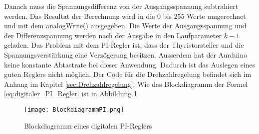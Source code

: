 Danach muss die Spannungsdifferenz von der Ausgangsspannung subtrahiert werden. Das Resultat der Berechnung wird in die 0 bis 255 Werte umgerechnet und mit dem analogWrite() ausgegeben. Die Werte der Ausgangsspannung und der Differenzspannung werden nach der Ausgabe in den Laufparameter $k-1$ geladen. Das Problem mit dem PI-Regler ist, dass der Thyristorsteller und die Spannungsverstärkung eine Verzögerung besitzen. Ausserdem hat der Aurduino keine konstante Abtastrate bei dieser Anwendung. Dadurch ist das Auslegen eines guten Reglers nicht möglich. Der Code für die Drehzahlregelung befindet sich im Anhang im Kapitel \ref{sec:Drehzahlregelung}. Wie das Blockdiagramm der Formel \ref{eq:digitaler_PI_Regler} ist in Abbildung \ref{fig:PIRegler}

\begin{figure}[ht!]
	\centering
	\texttt{[image: BlockdiagrammPI.png]}	
	\caption{Blockdiagramm eines digitalen PI-Reglers}\label{fig:PIRegler}\cite{PI_Regler}
\end{figure}







